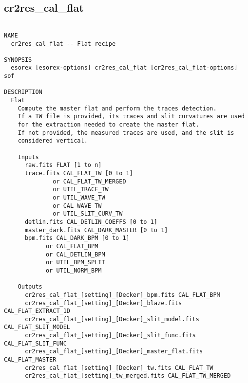 \subsection{cr2res\_cal\_flat}
\begin{verbatim}

NAME
  cr2res_cal_flat -- Flat recipe

SYNOPSIS
  esorex [esorex-options] cr2res_cal_flat [cr2res_cal_flat-options] sof

DESCRIPTION
  Flat                                                                    
    Compute the master flat and perform the traces detection.             
    If a TW file is provided, its traces and slit curvatures are used     
    for the extraction needed to create the master flat.                  
    If not provided, the measured traces are used, and the slit is        
    considered vertical.                                                  
                                                                          
    Inputs                                                                
      raw.fits FLAT [1 to n]                               
      trace.fits CAL_FLAT_TW [0 to 1]                  
              or CAL_FLAT_TW_MERGED                    
              or UTIL_TRACE_TW                         
              or UTIL_WAVE_TW                          
              or CAL_WAVE_TW                           
              or UTIL_SLIT_CURV_TW                     
      detlin.fits CAL_DETLIN_COEFFS [0 to 1]           
      master_dark.fits CAL_DARK_MASTER [0 to 1]        
      bpm.fits CAL_DARK_BPM [0 to 1]                   
            or CAL_FLAT_BPM                            
            or CAL_DETLIN_BPM                          
            or UTIL_BPM_SPLIT                          
            or UTIL_NORM_BPM                           
                                                                          
    Outputs                                                               
      cr2res_cal_flat_[setting]_[Decker]_bpm.fits CAL_FLAT_BPM
      cr2res_cal_flat_[setting]_[Decker]_blaze.fits CAL_FLAT_EXTRACT_1D
      cr2res_cal_flat_[setting]_[Decker]_slit_model.fits CAL_FLAT_SLIT_MODEL
      cr2res_cal_flat_[setting]_[Decker]_slit_func.fits CAL_FLAT_SLIT_FUNC
      cr2res_cal_flat_[setting]_[Decker]_master_flat.fits CAL_FLAT_MASTER
      cr2res_cal_flat_[setting]_[Decker]_tw.fits CAL_FLAT_TW
      cr2res_cal_flat_[setting]_tw_merged.fits CAL_FLAT_TW_MERGED
                                                                          

\end{verbatim}
